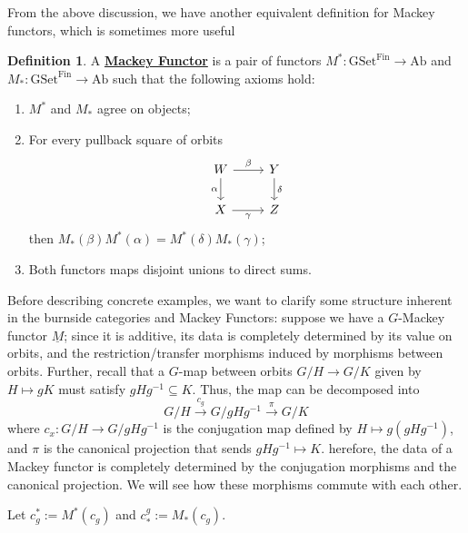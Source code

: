 \documentclass{article}
\theoremstyle{definition}
\theoremstyle{definition}
\newtheorem{definition}{Definition}[theorem]
\theoremstyle{definition}
\theoremstyle{definition}
\theoremstyle{definition}
\theoremstyle{definition}
\theoremstyle{definition}
\begin{document}
From the above discussion, we have another equivalent definition for Mackey functors, which is sometimes more useful 


\begin{tcolorbox}[colback=purple!5!white,colframe=purple!75!black]
    \begin{definition}
    A \underline{\textbf{Mackey Functor}} is a pair of functors $M^*: \textrm{GSet}^{\textrm{Fin}}\to \textrm{Ab}$ and $M_*: \textrm{GSet}^{\textrm{Fin}}\to \textrm{Ab}$ such that the following axioms hold:
    \begin{enumerate}
        \item $M^*$ and $M_*$ agree on objects;
        \item For every pullback square of orbits
        \[\begin{tikzcd}
            W & Y \\
            X & Z
            \arrow["\beta", from=1-1, to=1-2]
            \arrow["\alpha"', from=1-1, to=2-1]
            \arrow["\delta", from=1-2, to=2-2]
            \arrow["\gamma"', from=2-1, to=2-2]
        \end{tikzcd}\]
        then $M_*(\beta)M^*(\alpha)=M^*(\delta)M_*(\gamma)$;
        \item Both functors maps disjoint unions to direct sums. 
    \end{enumerate}
    \end{definition}
    \end{tcolorbox}
    


Before describing concrete examples, we want to clarify some structure inherent in the burnside categories and Mackey Functors: suppose we have a $G$-Mackey functor $\underline{M}$; since it is additive, its data is completely determined by its value on orbits, and the restriction/transfer morphisms induced by morphisms between orbits. Further, recall that a $G$-map between orbits $G/H\to G/K$ given by $H\mapsto gK$ must satisfy $gHg^{-1}\subseteq K$. Thus, the map can be decomposed into 
\[G/H\xrightarrow{c_{g}} G/gHg^{-1}\xrightarrow{\pi} G/K\] 
where $c_{x}: G/H\to G/gHg^{-1}$ is the conjugation map defined by $H\mapsto g(gHg^{-1})$, and $\pi$ is the canonical projection that sends $gHg^{-1}\mapsto K$. herefore, the data of a Mackey functor is completely determined by the conjugation morphisms and the canonical projection. We will see how these morphisms commute with each other.

Let $c_g^*:=M^*(c_g)$ and $c^g_*:=M_*(c_g)$. 
\end{document}
